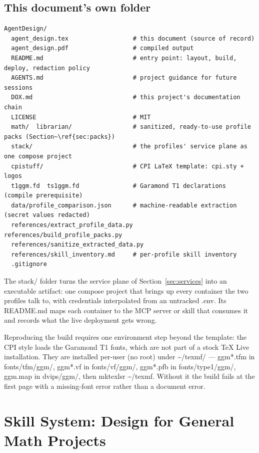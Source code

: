\documentclass[10pt]{article}
\newcommand{\mono}[1]{{\ttfamily\small #1}}
\begin{document}
\subsection*{This document's own folder}

\begin{lstlisting}[label=lst:agentdesign]
AgentDesign/
  agent_design.tex                  # this document (source of record)
  agent_design.pdf                  # compiled output
  README.md                         # entry point: layout, build, deploy, redaction policy
  AGENTS.md                         # project guidance for future sessions
  DOX.md                            # this project's documentation chain
  LICENSE                           # MIT
  math/  librarian/                 # sanitized, ready-to-use profile packs (Section~\ref{sec:packs})
  stack/                            # the profiles' service plane as one compose project
  cpistuff/                         # CPI LaTeX template: cpi.sty + logos
  t1ggm.fd  ts1ggm.fd               # Garamond T1 declarations (compile prerequisite)
  data/profile_comparison.json      # machine-readable extraction (secret values redacted)
  references/extract_profile_data.py   references/build_profile_packs.py
  references/sanitize_extracted_data.py
  references/skill_inventory.md     # per-profile skill inventory
  .gitignore
\end{lstlisting}

The \mono{stack/} folder turns the service plane of Section~\ref{sec:services} into an executable
artifact: one compose project that brings up every container the two profiles talk to, with
credentials interpolated from an untracked \mono{.env}. Its \mono{README.md} maps each container to
the MCP server or skill that consumes it and records what the live deployment gets wrong.

Reproducing the build requires one environment step beyond the template: the CPI style loads the
Garamond T1 fonts, which are not part of a stock TeX Live installation. They are installed
per-user (no root) under \mono{\textasciitilde/texmf/} --- \mono{ggm*.tfm} in \mono{fonts/tfm/ggm/},
\mono{ggm*.vf} in \mono{fonts/vf/ggm/}, \mono{ggm*.pfb} in \mono{fonts/type1/ggm/}, \mono{ggm.map}
in \mono{dvips/ggm/}, then \mono{mktexlsr \textasciitilde/texmf}. Without it the build fails at the
first page with a missing-font error rather than a document error.

\section{Skill System: Design for General Math Projects}\label{sec:skills}
\end{document}
